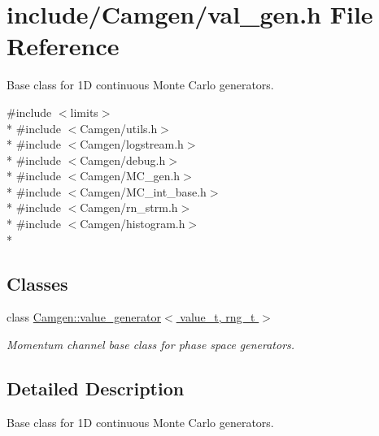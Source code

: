 \hypertarget{a00828}{}\section{include/\+Camgen/val\+\_\+gen.h File Reference}
\label{a00828}


Base class for 1\+D continuous Monte Carlo generators.  


{\ttfamily \#include $<$limits$>$}\\*
{\ttfamily \#include $<$Camgen/utils.\+h$>$}\\*
{\ttfamily \#include $<$Camgen/logstream.\+h$>$}\\*
{\ttfamily \#include $<$Camgen/debug.\+h$>$}\\*
{\ttfamily \#include $<$Camgen/\+M\+C\+\_\+gen.\+h$>$}\\*
{\ttfamily \#include $<$Camgen/\+M\+C\+\_\+int\+\_\+base.\+h$>$}\\*
{\ttfamily \#include $<$Camgen/rn\+\_\+strm.\+h$>$}\\*
{\ttfamily \#include $<$Camgen/histogram.\+h$>$}\\*
\subsection*{Classes}
\begin{DoxyCompactItemize}
\item 
class \hyperlink{a00577}{Camgen\+::value\+\_\+generator$<$ value\+\_\+t, rng\+\_\+t $>$}
\begin{DoxyCompactList}\small\item\em Momentum channel base class for phase space generators. \end{DoxyCompactList}\end{DoxyCompactItemize}


\subsection{Detailed Description}
Base class for 1\+D continuous Monte Carlo generators. 

